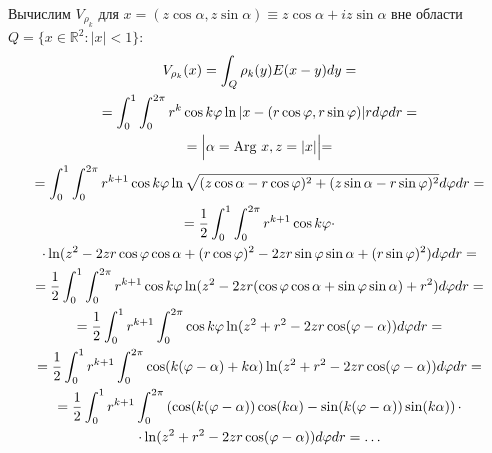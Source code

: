 \documentclass[a4paper]{article}
\newcommand{\R}[1]{\mathbb{R}^#1}
\begin{document}
  Вычислим $V_{\rho_k}$ для $x=(z \cos\alpha,z \sin \alpha) \equiv z \cos\alpha + i z \sin \alpha$ вне области $Q= \{x \in \R{2}: |x|<1 \}$:
\begin{multline}
  V_{\rho_k}(x)= \int_Q \rho_k(y) E(x-y) dy= \\
  =\int_0^1 \int_0^{2 \pi} r^k \cos k\varphi \ln |x-(r \cos \varphi, r \sin\varphi)| r d\varphi dr =\\
  =\Bigl|\alpha = \text{Arg}\ x, z=|x| \Bigl|=\\
  =\int_0^1 \int_0^{2 \pi} r^{k+1} \cos k\varphi \ln \sqrt{(z\cos \alpha-r \cos \varphi)^2+(z\sin \alpha-r \sin\varphi)^2} d\varphi dr=\\
  =\frac{1}{2} \int_0^1 \int_0^{2 \pi} r^{k+1} \cos k\varphi \cdot \\
  \cdot \ln(z^2 - 2z r \cos\varphi \cos \alpha +(r \cos \varphi)^2 - 2z r \sin \varphi \sin \alpha +(r \sin \varphi)^2) d\varphi dr =\\
  =\frac{1}{2} \int_0^1 \int_0^{2 \pi} r^{k+1} \cos k\varphi \ln(z^2-2zr(\cos \varphi \cos \alpha + \sin \varphi \sin \alpha)+r^{2})d\varphi dr=\\
  =\frac{1}{2} \int_0^1 r^{k+1}\int_0^{2 \pi}  \cos k\varphi \ln(z^2 + r^{2} - 2zr \cos (\varphi -\alpha)) d\varphi dr=\\
  =\frac{1}{2} \int_0^1 r^{k+1}\int_0^{2 \pi}\cos (k(\varphi -\alpha)+k\alpha)\ln(z^2 + r^{2} - 2zr \cos (\varphi -\alpha)) d\varphi dr= \\
  =\frac{1}{2} \int_0^1 r^{k+1}\int_0^{2 \pi}\left(\cos (k(\varphi -\alpha)) \cos(k\alpha) - \sin (k(\varphi -\alpha)) \sin(k\alpha)\right) \cdot \\
  \cdot \ln(z^2 + r^{2} - 2zr \cos (\varphi -\alpha)) d\varphi dr=\dots
\end{multline}
\end{document}
